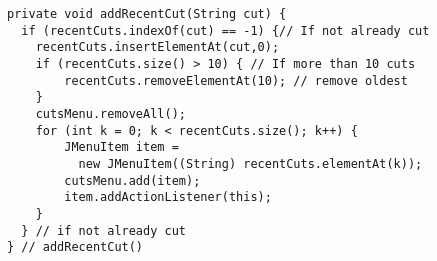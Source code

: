 \begin{ANS}
\begin{jjjlisting}
\begin{lstlisting}
private void addRecentCut(String cut) {
  if (recentCuts.indexOf(cut) == -1) {// If not already cut
    recentCuts.insertElementAt(cut,0);
    if (recentCuts.size() > 10) { // If more than 10 cuts
        recentCuts.removeElementAt(10); // remove oldest
    }
    cutsMenu.removeAll();
    for (int k = 0; k < recentCuts.size(); k++) {
        JMenuItem item = 
          new JMenuItem((String) recentCuts.elementAt(k));
        cutsMenu.add(item);
        item.addActionListener(this);
    }
  } // if not already cut
} // addRecentCut()
\end{lstlisting}
\end{jjjlisting}

\end{ANS}



\pagebreak
{}

